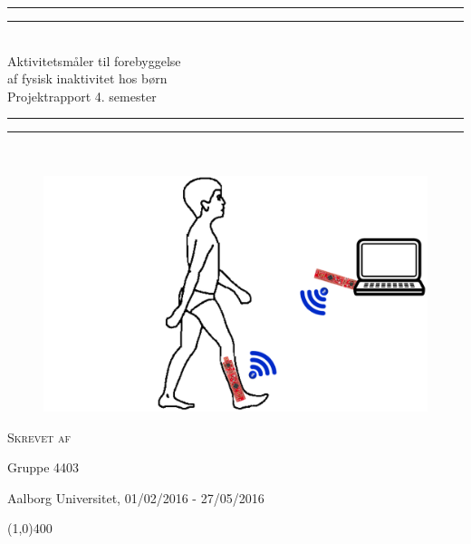 \begin{center}
	\vspace*{\baselineskip}
	\rule{\textwidth}{1.6pt}\vspace*{-\baselineskip}\vspace*{2pt} %
	\rule{\textwidth}{0.4pt}\\[\baselineskip] %
	
	{\huge Aktivitetsmåler til forebyggelse\\\hspace*{2ex} af fysisk inaktivitet hos børn \\[0.5\baselineskip] \large Projektrapport 4. semester}\\[0.2\baselineskip] %
	
	\rule{\textwidth}{0.4pt}\vspace*{-\baselineskip}\vspace{3.2pt} %
	\rule{\textwidth}{1.6pt}\\[\baselineskip] %
	\vspace*{4.5\baselineskip}
	\begin{figure}[H]
		\centering
		\begin{minipage}[c]{1\textwidth}
			\includegraphics[width=.75\textwidth]{figures/forside2.PNG}
		\end{minipage}
		\hfill
	\end{figure}
	\vspace*{\fill}
	\scshape %
	Skrevet af \\
	{\Large Gruppe 4403\par}
	
	\vspace*{.8\baselineskip} %
	
	Aalborg Universitet,  01/02/2016 - 27/05/2016 \par %
\end{center} %

\begin{center}
	\line(1,0){400}
\end{center}